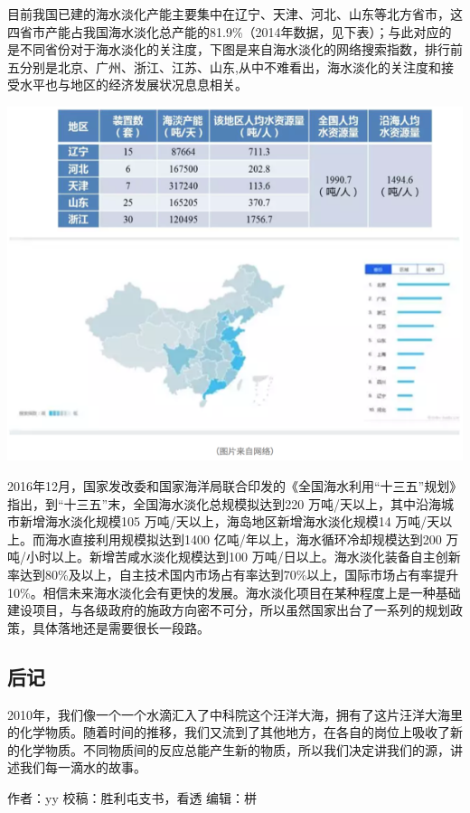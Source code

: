 \documentclass[]{book}
\begin{document}
目前我国已建的海水淡化产能主要集中在辽宁、天津、河北、山东等北方省市，这四省市产能占我国海水淡化总产能的81.9\%（2014年数据，见下表）；与此对应的是不同省份对于海水淡化的关注度，下图是来自海水淡化的网络搜索指数，排行前五分别是北京、广州、浙江、江苏、山东,从中不难看出，海水淡化的关注度和接受水平也与地区的经济发展状况息息相关。

\includegraphics[width=8.33in]{images/seawater5}

2016年12月，国家发改委和国家海洋局联合印发的《全国海水利用``十三五''规划》指出，到``十三五''末，全国海水淡化总规模拟达到220
万吨/天以上，其中沿海城市新增海水淡化规模105
万吨/天以上，海岛地区新增海水淡化规模14
万吨/天以上。而海水直接利用规模拟达到1400
亿吨/年以上，海水循环冷却规模达到200
万吨/小时以上。新增苦咸水淡化规模达到100
万吨/日以上。海水淡化装备自主创新率达到80\%及以上，自主技术国内市场占有率达到70\%以上，国际市场占有率提升10\%。相信未来海水淡化会有更快的发展。海水淡化项目在某种程度上是一种基础建设项目，与各级政府的施政方向密不可分，所以虽然国家出台了一系列的规划政策，具体落地还是需要很长一段路。

\subsection{后记}

2010年，我们像一个一个水滴汇入了中科院这个汪洋大海，拥有了这片汪洋大海里的化学物质。随着时间的推移，我们又流到了其他地方，在各自的岗位上吸收了新的化学物质。不同物质间的反应总能产生新的物质，所以我们决定讲我们的源，讲述我们每一滴水的故事。

作者：yy 校稿：胜利屯支书，看透 编辑：栟
\end{document}
